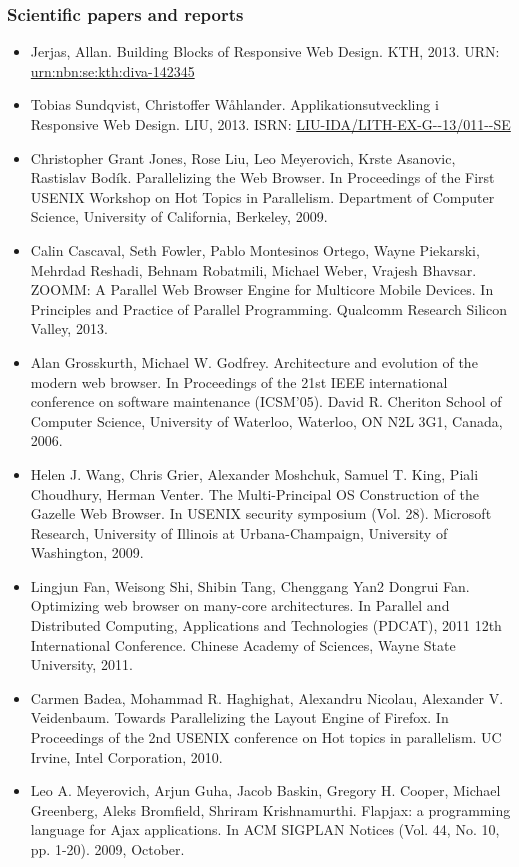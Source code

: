 \documentclass[oneside,a4paper,11pt]{kth-mag}
\begin{document}
\subsubsection*{Scientific papers and reports}
\begin{itemize}
\item Jerjas, Allan. Building Blocks of Responsive Web Design. KTH, 2013. URN: \url{urn:nbn:se:kth:diva-142345}
\item Tobias Sundqvist, Christoffer Wåhlander. Applikationsutveckling i Responsive Web Design. LIU, 2013. ISRN: \url{LIU-IDA/LITH-EX-G--13/011--SE}
\item Christopher Grant Jones, Rose Liu, Leo Meyerovich, Krste Asanovic, Rastislav Bodík. Parallelizing the Web Browser. In Proceedings of the First USENIX Workshop on Hot Topics in Parallelism. Department of Computer Science, University of California, Berkeley, 2009.
\item Calin Cascaval, Seth Fowler, Pablo Montesinos Ortego, Wayne Piekarski, Mehrdad Reshadi, Behnam Robatmili, Michael Weber, Vrajesh Bhavsar. ZOOMM: A Parallel Web Browser Engine for Multicore Mobile Devices. In Principles and Practice of Parallel Programming. Qualcomm Research Silicon Valley, 2013.
\item Alan Grosskurth, Michael W. Godfrey. Architecture and evolution of the modern web browser. In Proceedings of the 21st IEEE international conference on software maintenance (ICSM'05). David R. Cheriton School of Computer Science, University of Waterloo, Waterloo, ON N2L 3G1, Canada, 2006.
\item Helen J. Wang, Chris Grier, Alexander Moshchuk, Samuel T. King, Piali Choudhury, Herman Venter. The Multi-Principal OS Construction of the Gazelle Web Browser. In USENIX security symposium (Vol. 28). Microsoft Research, University of Illinois at Urbana-Champaign, University of Washington, 2009.
\item Lingjun Fan, Weisong Shi, Shibin Tang, Chenggang Yan2 Dongrui Fan. Optimizing web browser on many-core architectures. In Parallel and Distributed Computing, Applications and Technologies (PDCAT), 2011 12th International Conference. Chinese Academy of Sciences, Wayne State University, 2011.
\item Carmen Badea, Mohammad R. Haghighat, Alexandru Nicolau, Alexander V. Veidenbaum. Towards Parallelizing the Layout Engine of Firefox. In Proceedings of the 2nd USENIX conference on Hot topics in parallelism. UC Irvine, Intel Corporation, 2010.
\item Leo A. Meyerovich, Arjun Guha, Jacob Baskin, Gregory H. Cooper, Michael Greenberg, Aleks Bromfield, Shriram Krishnamurthi. Flapjax: a programming language for Ajax applications. In ACM SIGPLAN Notices (Vol. 44, No. 10, pp. 1-20). 2009, October.
\end{itemize}
\end{document}

